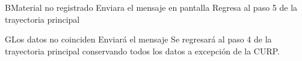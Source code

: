 		
		\begin{UCtrayectoriaA}{B}{Material no registrado}
			\UCpaso[\UCsist] Enviara el mensaje en pantalla 
			\UCpaso[\UCsist] Regresa al paso 5 de la trayectoria principal	
		\end{UCtrayectoriaA}	
		
		
		
		\begin{UCtrayectoriaA}{G}{Los datos no coinciden}
			\UCpaso[\UCsist] Enviará el mensaje  
			\UCpaso[\UCsist] Se regresará al paso 4 de la trayectoria principal conservando todos los datos a excepción de la CURP.

		\end{UCtrayectoriaA}
		
		
		
		
		
		
